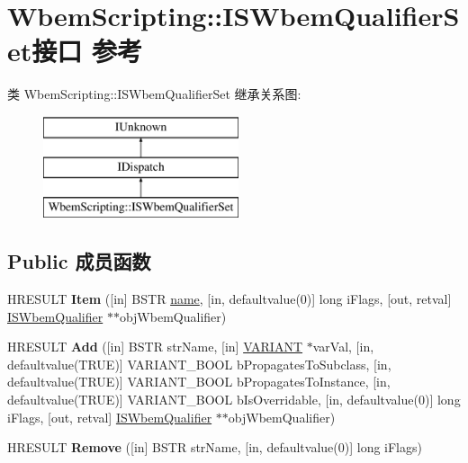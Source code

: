 \hypertarget{interface_wbem_scripting_1_1_i_s_wbem_qualifier_set}{}\section{Wbem\+Scripting\+:\+:I\+S\+Wbem\+Qualifier\+Set接口 参考}
\label{interface_wbem_scripting_1_1_i_s_wbem_qualifier_set}
类 Wbem\+Scripting\+:\+:I\+S\+Wbem\+Qualifier\+Set 继承关系图\+:\begin{figure}[H]
\begin{center}
\leavevmode
\includegraphics[height=3.000000cm]{interface_wbem_scripting_1_1_i_s_wbem_qualifier_set}
\end{center}
\end{figure}
\subsection*{Public 成员函数}
\begin{DoxyCompactItemize}
\item 
\mbox{\label{interface_wbem_scripting_1_1_i_s_wbem_qualifier_set_a050b6b3125237e191aff3930b500a228}} 
H\+R\+E\+S\+U\+LT {\bfseries Item} (\mbox{[}in\mbox{]} B\+S\+TR \hyperlink{structname}{name}, \mbox{[}in, defaultvalue(0)\mbox{]} long i\+Flags, \mbox{[}out, retval\mbox{]} \hyperlink{interface_wbem_scripting_1_1_i_s_wbem_qualifier}{I\+S\+Wbem\+Qualifier} $\ast$$\ast$obj\+Wbem\+Qualifier)
\item 
\mbox{\label{interface_wbem_scripting_1_1_i_s_wbem_qualifier_set_ade49d71b40e3e84bf276e46b51b7f06b}} 
H\+R\+E\+S\+U\+LT {\bfseries Add} (\mbox{[}in\mbox{]} B\+S\+TR str\+Name, \mbox{[}in\mbox{]} \hyperlink{structtag_v_a_r_i_a_n_t}{V\+A\+R\+I\+A\+NT} $\ast$var\+Val, \mbox{[}in, defaultvalue(T\+R\+UE)\mbox{]} V\+A\+R\+I\+A\+N\+T\+\_\+\+B\+O\+OL b\+Propagates\+To\+Subclass, \mbox{[}in, defaultvalue(T\+R\+UE)\mbox{]} V\+A\+R\+I\+A\+N\+T\+\_\+\+B\+O\+OL b\+Propagates\+To\+Instance, \mbox{[}in, defaultvalue(T\+R\+UE)\mbox{]} V\+A\+R\+I\+A\+N\+T\+\_\+\+B\+O\+OL b\+Is\+Overridable, \mbox{[}in, defaultvalue(0)\mbox{]} long i\+Flags, \mbox{[}out, retval\mbox{]} \hyperlink{interface_wbem_scripting_1_1_i_s_wbem_qualifier}{I\+S\+Wbem\+Qualifier} $\ast$$\ast$obj\+Wbem\+Qualifier)
\item 
\mbox{\label{interface_wbem_scripting_1_1_i_s_wbem_qualifier_set_a0a44cdc5527d0642d01400a16c9d5216}} 
H\+R\+E\+S\+U\+LT {\bfseries Remove} (\mbox{[}in\mbox{]} B\+S\+TR str\+Name, \mbox{[}in, defaultvalue(0)\mbox{]} long i\+Flags)
\end{DoxyCompactItemize}
